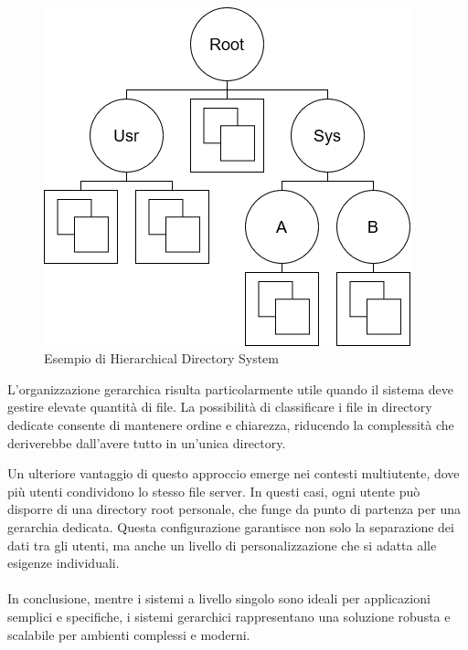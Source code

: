 \documentclass[12pt,a4paper,openright,twoside]{book}
\begin{document}
            \paragraph*{}
            
            \begin{figure}
                \centering
                \includegraphics[width=.5\linewidth]{figures/MultipleDirSystem.png}
                \caption{Esempio di Hierarchical Directory System}
                \label{fig:hierarchical-directory}
            \end{figure}

            L'organizzazione gerarchica risulta particolarmente utile quando il sistema deve gestire elevate quantità di file. La possibilità di classificare i file in directory dedicate consente di mantenere ordine e chiarezza, riducendo la complessità che deriverebbe dall'avere tutto in un'unica directory.

            Un ulteriore vantaggio di questo approccio emerge nei contesti multiutente, dove più utenti condividono lo stesso file server. In questi casi, ogni utente può disporre di una directory root personale, che funge da punto di partenza per una gerarchia dedicata. Questa configurazione garantisce non solo la separazione dei dati tra gli utenti, ma anche un livello di personalizzazione che si adatta alle esigenze individuali.

            \paragraph*{}

            In conclusione, mentre i sistemi a livello singolo sono ideali per applicazioni semplici e specifiche, i sistemi gerarchici rappresentano una soluzione robusta e scalabile per ambienti complessi e moderni.

        \cite{tanenbaum2015modern}
\end{document}
